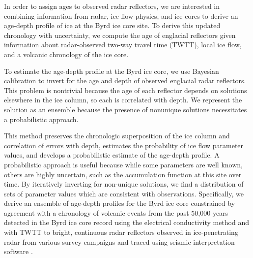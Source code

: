 


In order to assign ages to observed radar reflectors, we are interested in combining information from radar, ice flow physics, and ice cores to derive an age-depth profile of ice at the Byrd ice core site. To derive this updated chronology with uncertainty, we compute the age of englacial reflectors given information about radar-observed two-way travel time (TWTT), local ice flow, and a volcanic chronology of the ice core.

To estimate the age-depth profile at the Byrd ice core, we use Bayesian calibration to invert for the age and depth of observed englacial radar reflectors. This problem is nontrivial because the age of each reflector depends on solutions elsewhere in the ice column, so each is correlated with depth. We represent the solution as an ensemble because the presence of nonunique solutions necessitates a probabilistic approach.

This method preserves the chronologic superposition of the ice column and correlation of errors with depth, estimates the probability of ice flow parameter values, and develops a probabilistic estimate of the age-depth profile. A probabilistic approach is useful because while some parameters are well known, others are highly uncertain, such as the accumulation function at this site over time. By iteratively inverting for non-unique solutions, we find a distribution of sets of parameter values which are consistent with observations. Specifically, we derive an ensemble of age-depth profiles for the Byrd ice core constrained by agreement with a chronology of volcanic events from the past 50,000 years detected in the Byrd ice core record using the electrical conductivity method \citep{hammer1997} and with TWTT to bright, continuous radar reflectors observed in ice-penetrating radar from various survey campaigns and traced using seismic interpretation software \cite{surveys,software}.


